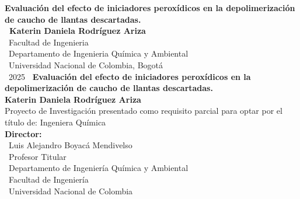 \documentclass[12pt,spanish,fleqn,openany,twoside,letterpaper]{book}
\newcommand{\academictitle}{}
\newcommand{\codirector}{} %
\newcommand{\codirectortitle}{} %
\newcommand{\department}{}
\newcommand{\faculty}{}
\newcommand{\university}{Universidad Nacional de Colombia}
\renewcommand{\codirector}{Prof. Dr. Co director}
\renewcommand{\codirectortitle}{Indicar si es Profesor Titular/Asociado}
\renewcommand{\academictitle}{Magíster (M, MSc) o Doctor (PhD) - Modalidad }
\renewcommand{\department}{Departamento}
\renewcommand{\faculty}{Facultad}
\newcommand{\nombreTesis}{Evaluación del efecto de iniciadores peroxídicos en la depolimerización de caucho de llantas descartadas.}
\begin{document}
\renewcommand{\listfigurename}{\sffamily Lista de figuras}
\renewcommand{\listtablename}{\sffamily Lista de tablas}
\renewcommand{\contentsname}{\sffamily Contenido}
\renewcommand{\chaptername}{\sffamily Capítulo}
\renewcommand{\tablename}{\scriptsize \centering \textbf{Tabla}}
\renewcommand{\figurename}{\scriptsize \centering \textbf{Figura}}
\renewcommand{\appendixname}{\sffamily Anexo}

\renewcommand{\bibname}{\sffamily Referencias Bibliográficas}

{\newpage
\thispagestyle{empty}
\begin{center}
\begin{figure}
\centering
{}%
\end{figure}
\vspace{2.5cm}
\textbf{\huge \nombreTesis} \\ 
\vspace{2.5cm}
\textbf{\Large \ Katerin Daniela Rodríguez Ariza} \\ 
\vspace{5.0cm}
\ Facultad de Ingenieria \\ \ Departamento de Ingenieria Química y Ambiental \\
\ Universidad Nacional de Colombia, Bogotá\\
\ 2025
\newpage 
\thispagestyle{empty}
\vspace{2.0cm}
\textbf{\huge \ Evaluación del efecto de iniciadores peroxídicos en la depolimerización de caucho de llantas descartadas.} \\
\vspace{2.0cm}
\textbf{\Large Katerin Daniela Rodríguez Ariza} \\
\vspace{2.0cm}
\small Proyecto de Investigación presentado como requisito parcial para optar por el título de: Ingeniera Química \\
\vspace{2.0cm}
\textbf{Director:} \\
\ Luis Alejandro Boyacá Mendivelso \\
\ Profesor Titular \\
\ Departamento de Ingeniería Química y Ambiental \\
\ Facultad de Ingeniería \\
\ Universidad Nacional de Colombia \\ 
\vspace{0.5cm}


\end{center}}
\end{document}
